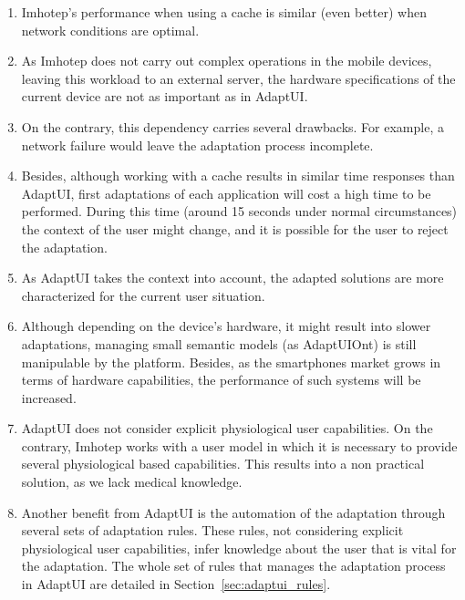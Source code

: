 \begin{enumerate}[label=\alph*)]
  \item Imhotep's performance when using a cache is similar (even better) when
  network conditions are optimal. 
  
  \item As Imhotep does not carry out complex operations in the mobile devices,
  leaving this workload to an external server, the hardware specifications of 
  the current device are not as important as in AdaptUI.
  
  \item On the contrary, this dependency carries several drawbacks. For 
  example, a network failure would leave the adaptation process incomplete.
  
  \item Besides, although working with a cache results in similar time responses
  than AdaptUI, first adaptations of each application will cost a high time to
  be performed. During this time (around 15 seconds under normal circumstances)
  the context of the user might change, and it is possible for the user to 
  reject the adaptation.
  
  \item As AdaptUI takes the context into account, the adapted solutions are
  more characterized for the current user situation.
  
  \item Although depending on the device's hardware, it might result into slower
  adaptations, managing small semantic models (as AdaptUIOnt) is still 
  manipulable by the platform. Besides, as the smartphones market grows in terms
  of hardware capabilities, the performance of such systems will be increased.
  
  \item AdaptUI does not consider explicit physiological user capabilities. On 
  the contrary, Imhotep works with a user model in which it is necessary to
  provide several physiological based capabilities. This results into a non
  practical solution, as we lack medical knowledge.
  
  \item Another benefit from AdaptUI is the automation of the adaptation 
  through several sets of adaptation rules. These rules, not considering 
  explicit physiological user capabilities, infer knowledge about the user that
  is vital for the adaptation. The whole set of rules that manages the adaptation
  process in AdaptUI are detailed in Section~\ref{sec:adaptui_rules}.
\end{enumerate}